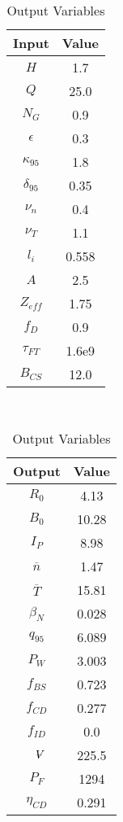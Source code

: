 \begin{table}[h!]
\centering  
\caption{Charybdis Variables}
\hfill
\begin{subtable}[t]{0.4\textwidth}
\centering  
\caption{Input Variables} ~\\
\begin{tabular}{ c|c } 

Input            & Value           \\
\hline
$H$              & 1.7              \\
$Q$              & 25.0             \\
$N_{G}$          & 0.9              \\
$\epsilon$       & 0.3              \\
$\kappa_{95}$    & 1.8              \\
$\delta_{95}$    & 0.35             \\
$\nu_{n}$        & 0.4              \\
$\nu_{T}$        & 1.1              \\
$l_{i}$          & 0.558         \\
$A$              & 2.5              \\
$Z_{eff}$        & 1.75             \\
$f_{D}$          & 0.9              \\
$\tau_{FT}$      & 1.6e9            \\
$B_{CS}$         & 12.0             \\

\end{tabular}
\end{subtable}
\hfill
\begin{subtable}[t]{0.5\textwidth}
\centering  
\caption{Output Variables} ~\\
\begin{tabular}{ c|c } 

Output           & Value       \\
\hline
$R_{0}$          & 4.13            \\
$B_{0}$          & 10.28            \\
$I_{P}$          & 8.98            \\
$\overline n$    & 1.47            \\
$\overline T$    & 15.81           \\
$\beta_{N}$       & 0.028            \\
$q_{95}$         & 6.089            \\
$P_{W}$          & 3.003            \\
$f_{BS}$         & 0.723           \\
$f_{CD}$         & 0.277           \\
$f_{ID}$         & 0.0              \\
$\volume$         & 225.5            \\
$P_{F}$          & 1294           \\
$\eta_{CD}$      & 0.291           \\


\end{tabular}
\end{subtable}
\end{table}
